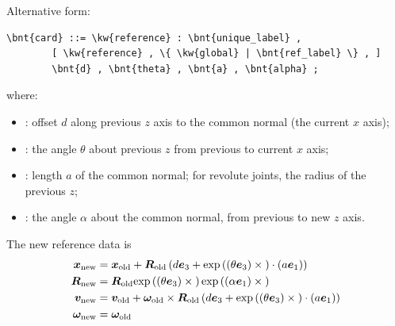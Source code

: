 Alternative form:
\begin{Verbatim}[commandchars=\\\{\}]
    \bnt{card} ::= \kw{reference} : \bnt{unique_label} , 
        [ \kw{reference} , \{ \kw{global} | \bnt{ref_label} \} , ]
        \bnt{d} , \bnt{theta} , \bnt{a} , \bnt{alpha} ;
\end{Verbatim}
where:
\begin{itemize}
\item {}: offset $d$ along previous $z$ axis to the common normal (the current $x$ axis);

\item {}: the angle $\theta$ about previous $z$ from previous to current $x$ axis;

\item {}: length $a$ of the common normal; for revolute joints, the radius of the previous $z$;

\item {}: the angle $\alpha$ about the common normal, from previous to new $z$ axis.
\end{itemize}
The new reference data is
\begin{subequations}
\begin{align}
	\boldsymbol{x}_\text{new}
	&=
	\boldsymbol{x}_\text{old}
	+
	\boldsymbol{R}_\text{old} \left( 
		d \boldsymbol{e}_3
		+
		\text{exp}\left( \left( \theta \boldsymbol{e}_3 \right) \times{} \right) \cdot \left( a \boldsymbol{e}_1 \right)
	 \right)
	\\
	\boldsymbol{R}_\text{new}
	&=
	\boldsymbol{R}_\text{old} \text{exp}\left( \left( \theta \boldsymbol{e}_3 \right) \times{} \right) \text{exp}\left( \left( \alpha \boldsymbol{e}_1 \right) \times{} \right)
	\\
	\boldsymbol{v}_\text{new}
	&=
	\boldsymbol{v}_\text{old}
	+
	\boldsymbol{\omega}_\text{old} \times \boldsymbol{R}_\text{old} \left( 
		d \boldsymbol{e}_3
		+
		\text{exp}\left( \left( \theta \boldsymbol{e}_3 \right) \times{} \right) \cdot \left( a \boldsymbol{e}_1 \right)
	 \right)
	\\
	\boldsymbol{\omega}_\text{new}
	&=
	\boldsymbol{\omega}_\text{old}
\end{align}
\end{subequations}

